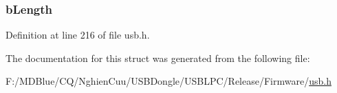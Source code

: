 \hypertarget{struct___u_s_b___c_o_m_m_o_n___d_e_s_c_r_i_p_t_o_r_a8e443464272fdf3bd5148df0b7f5dcaf}{
\subsubsection[{bLength}]{ {\bf bLength}}}
\label{struct___u_s_b___c_o_m_m_o_n___d_e_s_c_r_i_p_t_o_r_a8e443464272fdf3bd5148df0b7f5dcaf}


Definition at line 216 of file usb.h.



The documentation for this struct was generated from the following file:\begin{DoxyCompactItemize}
\item 
F:/MDBlue/CQ/NghienCuu/USBDongle/USBLPC/Release/Firmware/\hyperlink{usb_8h}{usb.h}\end{DoxyCompactItemize}
